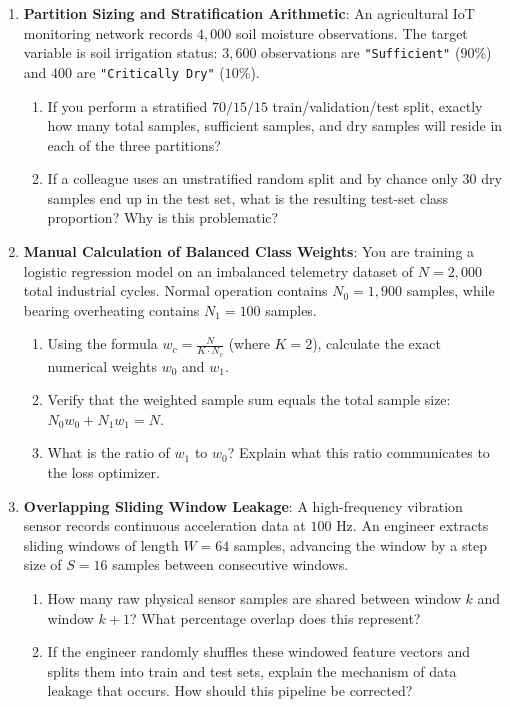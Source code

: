 \begin{checkyourself}
\begin{enumerate}
    \item \textbf{Partition Sizing and Stratification Arithmetic}:
    An agricultural IoT monitoring network records $4{,}000$ soil moisture observations. The target variable is soil irrigation status: $3{,}600$ observations are \texttt{"Sufficient"} ($90\%$) and $400$ are \texttt{"Critically Dry"} ($10\%$).
    \begin{enumerate}[label=(\alph*)]
        \item If you perform a stratified $70/15/15$ train/validation/test split, exactly how many total samples, sufficient samples, and dry samples will reside in each of the three partitions?
        \item If a colleague uses an unstratified random split and by chance only $30$ dry samples end up in the test set, what is the resulting test-set class proportion? Why is this problematic?
    \end{enumerate}

    \item \textbf{Manual Calculation of Balanced Class Weights}:
    You are training a logistic regression model on an imbalanced telemetry dataset of $N = 2{,}000$ total industrial cycles. Normal operation contains $N_0 = 1{,}900$ samples, while bearing overheating contains $N_1 = 100$ samples.
    \begin{enumerate}[label=(\alph*)]
        \item Using the formula $w_c = \frac{N}{K \cdot N_c}$ (where $K=2$), calculate the exact numerical weights $w_0$ and $w_1$.
        \item Verify that the weighted sample sum equals the total sample size: $N_0 w_0 + N_1 w_1 = N$.
        \item What is the ratio of $w_1$ to $w_0$? Explain what this ratio communicates to the loss optimizer.
    \end{enumerate}

    \item \textbf{Overlapping Sliding Window Leakage}:
    A high-frequency vibration sensor records continuous acceleration data at $100\text{ Hz}$. An engineer extracts sliding windows of length $W = 64$ samples, advancing the window by a step size of $S = 16$ samples between consecutive windows.
    \begin{enumerate}[label=(\alph*)]
        \item How many raw physical sensor samples are shared between window $k$ and window $k+1$? What percentage overlap does this represent?
        \item If the engineer randomly shuffles these windowed feature vectors and splits them into train and test sets, explain the mechanism of data leakage that occurs. How should this pipeline be corrected?
    \end{enumerate}


\end{enumerate}
\end{checkyourself}
